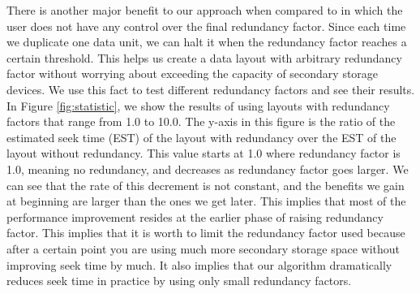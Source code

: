 There is another major benefit to our approach when compared to \cite{optimizingredundancy} in which the user does not have any control over the final redundancy factor. Since each time we duplicate one data unit, we can halt it when the redundancy factor reaches a certain threshold. This helps us create a data layout with arbitrary redundancy factor without worrying about exceeding the capacity of secondary storage devices. We use this fact to test different redundancy factors and see their results. In Figure \ref{fig:statistic}, we show the results of using layouts with redundancy factors that range from 1.0 to 10.0. The y-axis in this figure is the ratio of the estimated seek time (EST) of the layout with redundancy over the EST of the layout without redundancy. This value starts at 1.0 where redundancy factor is 1.0, meaning no redundancy, and decreases as redundancy factor goes larger. We can see that the rate of this decrement is not constant, and the benefits we gain at beginning are larger than the ones we get later. This implies that most of the performance improvement resides at the earlier phase of raising redundancy factor. This implies that it is worth to limit the redundancy factor used because after a certain point you are using much more secondary storage space without improving seek time by much. It also implies that our algorithm dramatically reduces seek time in practice by using only small redundancy factors. 

